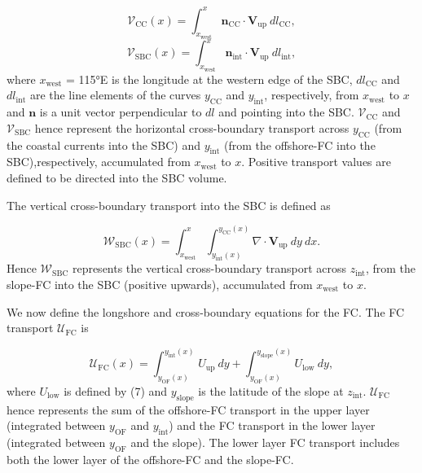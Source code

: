 \documentclass[preprint,3p,review,12pt]{elsarticle}
\renewcommand{\Vec}[1]{\mathbf{#1}}
\newcommand{\sub}[1]{_{\text{#1}}}
\begin{document}
\begin{equation} \label{eq:4}
\mathcal{V}\sub{CC}(x) = \int_{x\sub{west}}^{x}\Vec{n}\sub{CC}\cdot\Vec{V}\sub{up}\ dl\sub{CC},
\end{equation}
%
\begin{equation} \label{eq:5}
\mathcal{V}\sub{SBC}(x) = \int_{x\sub{west}}^{x}\Vec{n}\sub{int}\cdot\Vec{V}\sub{up}\ dl\sub{int},
\end{equation}
%
where $x\sub{west}$ = \ang{115}E is the longitude at the western edge of the SBC, $dl\sub{CC}$ and $dl\sub{int}$ are the line elements of the curves $y\sub{CC}$ and $y\sub{int}$, respectively, from $x\sub{west}$ to $x$ and $\Vec{n}$ is a unit vector perpendicular to $dl$ and pointing into the SBC\@.
$\mathcal{V}\sub{CC}$ and $\mathcal{V}\sub{SBC}$ hence represent the horizontal cross-boundary transport across $y\sub{CC}$ (from the coastal currents into the SBC) and $y\sub{int}$ (from the offshore-FC into the SBC),respectively, accumulated from $x\sub{west}$ to $x$. Positive transport values are defined to be directed into the SBC volume.

The vertical cross-boundary transport into the SBC is defined as

\begin{equation} \label{eq:6}
\mathcal{W}\sub{SBC}(x)
= \int_{x\sub{west}}^{x} \int_{y\sub{int}(x)}^{y\sub{CC}(x)} \nabla\cdot\Vec{V}\sub{up}\ dy\ dx.
\end{equation}
%
Hence $\mathcal{W}\sub{SBC}$ represents the vertical cross-boundary transport across $z\sub{int}$, from the slope-FC into the SBC (positive upwards), accumulated from $x\sub{west}$ to $x$.

We now define the longshore and cross-boundary equations for the FC\@. The FC transport $\mathcal{U}\sub{FC}$ is 

\begin{equation} \label{eq:7}
\mathcal{U}\sub{FC}(x) = \int_{y\sub{OF}(x)}^{y\sub{int}(x)}{U}\sub{up}\ dy
+ \int_{y\sub{OF}(x)}^{y\sub{slope}(x)}{U}\sub{low}\ dy,
\end{equation}
%
where $U\sub{low}$ is defined by (7) and $y\sub{slope}$ is the latitude of the slope at $z\sub{int}$. $\mathcal{U}\sub{FC}$ hence represents the sum of the offshore-FC transport in the upper layer (integrated between $y\sub{OF}$ and $y\sub{int}$) and the FC transport in the lower layer (integrated between $y\sub{OF}$ and the slope). The lower layer FC transport includes both the lower layer of the offshore-FC and the slope-FC.
\end{document}
